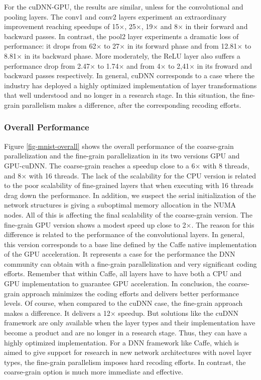 For the cuDNN-GPU, the results are similar, unless for the convolutional 
and pooling layers. The conv1 and conv2 layers experiment an extraordinary 
improvement reaching speedups of 15$\times$, 25$\times$, 19$\times$ and 8$\times$ in their 
forward and backward passes. In contrast, the pool2 layer experiments a 
dramatic loss of performance: it drops from 62$\times$ to 27$\times$ in its forward 
phase and from 12.81$\times$ to 8.81$\times$ in its backward phase. More moderately, 
the ReLU layer also suffers a performance drop from 2.47$\times$ to 1.74$\times$ and 
from 4$\times$ to 2,41$\times$ in its froward and backward passes respectively. 
In general, cuDNN corresponds to a case where the industry has deployed 
a highly optimized implementation of layer transformations that well 
understood and no longer in a research stage. In this situation, the 
fine-grain parallelism makes a difference, after the corresponding recoding 
efforts.


\subsubsection{Overall Performance}
Figure \ref{fig-mnist-overall} shows the overall performance of
the coarse-grain parallelization and the fine-grain parallelization in 
its two versions GPU and GPU-cuDNN. The coarse-grain reaches a speedup 
close to a 6$\times$ with 8 threads, and 8$\times$ with 16 threads. The lack of 
the scalability for the CPU version is related to the poor scalability 
of fine-grained layers that when executing with 16 threads drag down 
the performance. In addition, we suspect the serial initialization of 
the network structures is giving a suboptimal memory allocation in 
the NUMA nodes. All of this is affecting the final scalability of 
the coarse-grain version. The fine-grain GPU version shows a 
modest speed up close to 2$\times$. The reason for this difference is related 
to the performance of the convolutional layers. In general, this version 
corresponds to a base line defined by the Caffe native implementation 
of the GPU acceleration. It represents a case for the performance the DNN 
community can obtain with a fine-grain parallelization and very significant 
coding efforts. Remember that within Caffe, all layers have to have 
both a CPU and GPU implementation to guarantee GPU acceleration. 
In conclusion, the coarse-grain approach minimizes the coding efforts 
and delivers better performance levels. Of course, when compared to 
the cuDNN case, the fine-grain approach makes a difference. 
It delivers a 12$\times$ speedup. But solutions like the cuDNN framework are 
only available when the layer types and their implementation have become 
a product and are no longer in a research stage. Thus, they can have a 
highly optimized implementation. For a DNN framework like Caffe, 
which is aimed to give support for research in new network architectures 
with novel layer types, the fine-grain parallelism imposes hard recoding 
efforts. In contrast, the coarse-grain option is much more immediate and 
effective.

